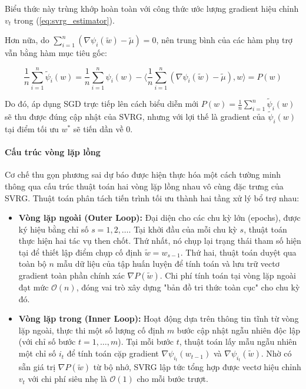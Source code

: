 Biểu thức này trùng khớp hoàn toàn với công thức ước lượng gradient hiệu chỉnh $v_t$ trong (\ref{eq:svrg_estimator}).



Hơn nữa, do $\sum_{i=1}^n (\nabla \psi_i(\tilde{w}) - \tilde{\mu}) = 0$, nên trung bình của các hàm phụ trợ vẫn bằng hàm mục tiêu gốc:

\begin{equation}
\frac{1}{n} \sum_{i=1}^n \tilde{\psi}_i(w) = \frac{1}{n} \sum_{i=1}^n \psi_i(w) - \langle \frac{1}{n} \sum_{i=1}^n (\nabla \psi_i(\tilde{w}) - \tilde{\mu}), w \rangle = P(w)
\end{equation}

Do đó, áp dụng SGD trực tiếp lên cách biểu diễn mới $P(w) = \frac{1}{n}\sum_{i=1}^n \tilde{\psi}_i(w)$ sẽ thu được đúng cập nhật của SVRG, nhưng với lợi thế là gradient của $\tilde{\psi}_i(w)$ tại điểm tối ưu $w^*$ sẽ tiến dần về 0.

\paragraph{Cấu trúc vòng lặp lồng}

Cơ chế thu gọn phương sai dự báo được hiện thực hóa một cách tường minh thông qua cấu trúc thuật toán hai vòng lặp lồng nhau vô cùng đặc trưng của SVRG. Thuật toán phân tách tiến trình tối ưu thành hai tầng xử lý bổ trợ nhau:

\begin{itemize}

    \item \textbf{Vòng lặp ngoài (Outer Loop):} Đại diện cho các chu kỳ lớn (epochs), được ký hiệu bằng chỉ số $s = 1, 2, \dots$. Tại khởi đầu của mỗi chu kỳ $s$, thuật toán thực hiện hai tác vụ then chốt. Thứ nhất, nó chụp lại trạng thái tham số hiện tại để thiết lập điểm chụp cố định $\tilde{w} = w_{s-1}$. Thứ hai, thuật toán duyệt qua toàn bộ $n$ mẫu dữ liệu của tập huấn luyện để tính toán và lưu trữ vectơ gradient toàn phần chính xác $\nabla P(\tilde{w})$. Chi phí tính toán tại vòng lặp ngoài đạt mức $\mathcal{O}(n)$, đóng vai trò xây dựng "bản đồ tri thức toàn cục" cho chu kỳ đó.

    \item \textbf{Vòng lặp trong (Inner Loop):} Hoạt động dựa trên thông tin tĩnh từ vòng lặp ngoài, thực thi một số lượng cố định $m$ bước cập nhật ngẫu nhiên độc lập (với chỉ số bước $t = 1, \dots, m$). Tại mỗi bước $t$, thuật toán lấy mẫu ngẫu nhiên một chỉ số $i_t$ để tính toán cặp gradient $\nabla \psi_{i_t}(w_{t-1})$ và $\nabla \psi_{i_t}(\tilde{w})$. Nhờ có sẵn giá trị $\nabla P(\tilde{w})$ từ bộ nhớ, SVRG lập tức tổng hợp được vectơ hiệu chỉnh $v_t$ với chi phí siêu nhẹ là $\mathcal{O}(1)$ cho mỗi bước trượt.

\end{itemize}



